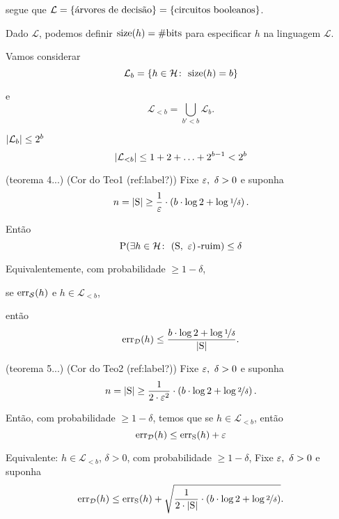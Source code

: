 {\begin{exemplo}
  segue que $\mathcal{L}=\l\{\text{árvores de decisão}\r\}=\l\{\text{circuitos booleanos}\r\}$.
\end{exemplo}

Dado $\mathcal{L}$, podemos definir $\mathrm{size}\l(h\r)=\#\mathrm{bits}$ para especificar $h$ na linguagem $\mathcal{L}$.

Vamos considerar
\[
  \mathcal{L}_b = \l\{h\in\mathcal{H}\colon\ \mathrm{size}\l(h\r)=b\r\}
\]

e
\[
  \mathcal{L}_{<b} = \bigcup_{b'<b} \mathcal{L}_b.
\]

\begin{observacao}
  $\l|\mathcal{L}_b\r| \leq 2^b$
  \[
    \l|\mathcal{L}_{<b}\r| \leq 1 + 2 + \ldots + 2^{b-1} < 2^b
  \]
\end{observacao}

\begin{teorema}
  \label{teo:teo4}
  \normalfont
  (teorema 4...)
  (Cor do Teo1 (ref:label?))
  Fixe $\eps,\ \delta>0$ e suponha
  \[
    n = \l|\mathrm{S}\r| \geq \frac{1}{\eps}\cdot\l(b\cdot\log2 + \log\nicefrac{1}{\delta}\r).
  \]

  Então
  \[
    \mathrm{P}\l(\exists h\in\mathcal{H}\colon\ \l(\mathrm{S},\ \eps\r)\text{-ruim}\r) \leq \delta
  \]
\end{teorema}

Equivalentemente, com probabilidade $\geq 1-\delta$,

se $\mathrm{err}_\mathcal{S}\l(h\r)$ e $h\in\mathcal{L}_{<b}$,

então
\[
  \mathrm{err}_\mathcal{D}\l(h\r) \leq \frac{b\cdot\log2 + \log\nicefrac{1}{\delta}}{\l|\mathrm{S}\r|}.
\]

\begin{teorema}
  \label{teo:teo5}
  \normalfont
  (teorema 5...)
  (Cor do Teo2 (ref:label?))
  Fixe $\eps,\ \delta>0$ e suponha
  \[
    n = \l|\mathrm{S}\r| \geq \frac{1}{2\cdot\eps^2}\cdot\l(b\cdot\log2 + \log\nicefrac{2}{\delta}\r).
  \]

  Então, com probabilidade $\geq 1-\delta$, temos que se $h\in\mathcal{L}_{<b}$, então
  \[
    \mathrm{err}_\mathcal{D}\l(h\r) \leq \mathrm{err}_\mathrm{S}\l(h\r) + \eps
  \]
\end{teorema}

\begin{corolario}
  \normalfont
  Equivalente: $h\in\mathcal{L}_{<b}$, $\delta>0$, com probabilidade $\geq 1-\delta$,
  Fixe $\eps,\ \delta>0$ e suponha
  \[
    \mathrm{err}_\mathcal{D}\l(h\r) \leq \mathrm{err}_\mathrm{S}\l(h\r) + \sqrt{\frac{1}{2\cdot\l|\mathrm{S}\r|}\cdot\l(b\cdot\log2 + \log\nicefrac{2}{\delta}\r)}.
  \]
\end{corolario}

}
